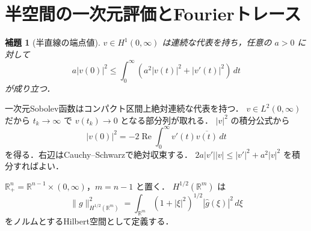 \documentclass[a5paper,10pt,onecolumn]{jsarticle}
\makeatletter
\theoremstyle{mathnotetheorem}
\newtheorem{lemma}[theorem]{補題}
\renewcommand{\proofname}{証明}
\renewenvironment{proof}[1][\proofname]{%
  \par\pushQED{\qed}\normalfont\topsep4\p@\@plus2\p@\relax
  \trivlist\item[\hskip\labelsep\bfseries #1]\ignorespaces
}{\popQED\endtrivlist\@endpefalse}
\newcommand{\norm}[1]{\lVert #1\rVert}
\makeatother
\begin{document}
\section{半空間の一次元評価とFourierトレース}
\begin{lemma}[半直線の端点値]
$v\in H^1(0,\infty)$ は連続な代表を持ち，任意の $a>0$ に対して
\[
 a|v(0)|^2\le\int_0^\infty(a^2|v(t)|^2+|v'(t)|^2)\,dt
\]
が成り立つ．
\end{lemma}
\begin{proof}
一次元Sobolev函数はコンパクト区間上絶対連続な代表を持つ．
$v\in L^2(0,\infty)$ だから $t_k\to\infty$ で
$v(t_k)\to0$ となる部分列が取れる．
$|v|^2$ の積分公式から
\[
 |v(0)|^2=-2\operatorname{Re}\int_0^\infty
     v'(t)\overline{v(t)}\,dt
\]
を得る．右辺はCauchy--Schwarzで絶対収束する．
$2a|v'||v|\le|v'|^2+a^2|v|^2$ を積分すればよい．
\end{proof}

$\mathbb R^n_+=\mathbb R^{n-1}\times(0,\infty)$，$m=n-1$ と置く．
$H^{1/2}(\mathbb R^m)$ は
\[
 \norm g_{H^{1/2}(\mathbb R^m)}^2
 =\int_{\mathbb R^m}(1+|\xi|^2)^{1/2}|\widehat g(\xi)|^2\,d\xi
\]
をノルムとするHilbert空間として定義する．
\end{document}
